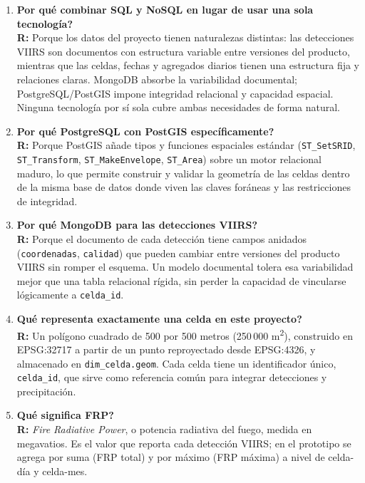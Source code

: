 \documentclass[11pt,a4paper]{article}
\begin{document}
\begin{enumerate}[leftmargin=1.2cm, itemsep=8pt, label=\textbf{P\arabic*.}]

\item \textbf{\textquestiondown Por qu\'e combinar SQL y NoSQL en lugar
de usar una sola tecnolog\'ia?}\\
\textbf{R:} Porque los datos del proyecto tienen naturalezas distintas:
las detecciones VIIRS son documentos con estructura variable entre
versiones del producto, mientras que las celdas, fechas y agregados
diarios tienen una estructura fija y relaciones claras. MongoDB
absorbe la variabilidad documental; PostgreSQL/PostGIS impone
integridad relacional y capacidad espacial. Ninguna tecnolog\'ia por
s\'i sola cubre ambas necesidades de forma natural.

\item \textbf{\textquestiondown Por qu\'e PostgreSQL con PostGIS
espec\'ificamente?}\\
\textbf{R:} Porque PostGIS a\~nade tipos y funciones espaciales
est\'andar (\texttt{ST\_SetSRID}, \texttt{ST\_Transform},
\texttt{ST\_MakeEnvelope}, \texttt{ST\_Area}) sobre un motor relacional
maduro, lo que permite construir y validar la geometr\'ia de las celdas
dentro de la misma base de datos donde viven las claves for\'aneas y
las restricciones de integridad.

\item \textbf{\textquestiondown Por qu\'e MongoDB para las detecciones
VIIRS?}\\
\textbf{R:} Porque el documento de cada detecci\'on tiene campos
anidados (\texttt{coordenadas}, \texttt{calidad}) que pueden cambiar
entre versiones del producto VIIRS sin romper el esquema. Un modelo
documental tolera esa variabilidad mejor que una tabla relacional
r\'igida, sin perder la capacidad de vincularse l\'ogicamente a
\texttt{celda\_id}.

\item \textbf{\textquestiondown Qu\'e representa exactamente una celda
en este proyecto?}\\
\textbf{R:} Un pol\'igono cuadrado de 500 por 500 metros (250\,000
m\textsuperscript{2}), construido en EPSG:32717 a partir de un punto
reproyectado desde EPSG:4326, y almacenado en
\texttt{dim\_celda.geom}. Cada celda tiene un identificador \'unico,
\texttt{celda\_id}, que sirve como referencia com\'un para integrar
detecciones y precipitaci\'on.

\item \textbf{\textquestiondown Qu\'e significa FRP?}\\
\textbf{R:} \textit{Fire Radiative Power}, o potencia radiativa del
fuego, medida en megavatios. Es el valor que reporta cada detecci\'on
VIIRS; en el prototipo se agrega por suma (FRP total) y por m\'aximo
(FRP m\'axima) a nivel de celda-d\'ia y celda-mes.


\end{enumerate}
\end{document}
